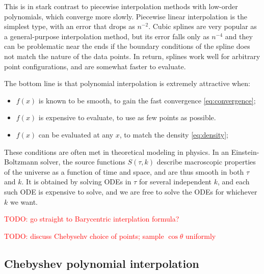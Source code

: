 \documentclass{aa}
\newcommand\TODO[1]{\textcolor{red}{TODO: #1}}
\begin{document}
This is in stark contrast to piecewise interpolation methods with low-order polynomials, which converge more slowly.
Piecewise linear interpolation is the simplest type, with an error that drops as $n^{-2}$.
Cubic splines are very popular as a general-purpose interpolation method, but its error falls only as $n^{-4}$ and they can be problematic near the ends if the boundary conditions of the spline does not match the nature of the data points.
In return, splines work well for arbitrary point configurations, and are somewhat faster to evaluate.

The bottom line is that polynomial interpolation is extremely attractive when:
\begin{itemize}
\item $f(x)$ is known to be smooth, to gain the fast convergence \eqref{eq:convergence};
\item $f(x)$ is expensive to evaluate, to use as few points as possible.
\item $f(x)$ can be evaluated at any $x$, to match the density \eqref{eq:density};
\end{itemize}

These conditions are often met in theoretical modeling in physics.
In an Einstein-Boltzmann solver, the source functions $S(\tau, k)$ describe macroscopic properties of the universe as a function of time and space, and are thus smooth in both $\tau$ and $k$.
It is obtained by solving ODEs in $\tau$ for several independent $k$, and each such ODE is expensive to solve, and we are free to solve the ODEs for whichever $k$ we want.

\TODO{go straight to Barycentric interplation formula?}

\TODO{discuss Chebysehv choice of points; sample $\cos \theta$ uniformly}

\subsection{Chebyshev polynomial interpolation}
\end{document}
